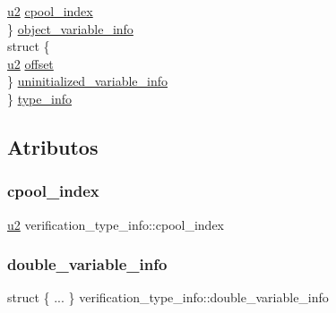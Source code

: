 \begin{DoxyCompactItemize}
\begin{tabbing}
\>\>\hyperlink{lista__operandos_8h_a732cde1300aafb73b0ea6c2558a7a54f}{u2} \hyperlink{structverification__type__info_a5be06fb276eacd06d97febe64d7be884}{cpool\_index}\\
\>\} \hyperlink{structverification__type__info_a8cc9c3b34278efa436261995cd97a326}{object\_variable\_info}\\
\>struct \{\\
\>\>\hyperlink{lista__operandos_8h_a732cde1300aafb73b0ea6c2558a7a54f}{u2} \hyperlink{structverification__type__info_a697499159761ac261e39a9f7aabfb27d}{offset}\\
\>\} \hyperlink{structverification__type__info_a732c79b23b52ddb0f77b5e25360d5253}{uninitialized\_variable\_info}\\
\} \hyperlink{structverification__type__info_a694db81e19f00bd3af2cfa2fca4c81d2}{type\_info}\\

\end{tabbing}\end{DoxyCompactItemize}


\subsection{Atributos}
\mbox{\label{structverification__type__info_a5be06fb276eacd06d97febe64d7be884}} 
\subsubsection{\texorpdfstring{cpool\+\_\+index}{cpool\_index}}
{\footnotesize\ttfamily \hyperlink{lista__operandos_8h_a732cde1300aafb73b0ea6c2558a7a54f}{u2} verification\+\_\+type\+\_\+info\+::cpool\+\_\+index}

\mbox{\label{structverification__type__info_a0198e2c34f8ffc66cbfe8adf0ab20170}} 
\subsubsection{\texorpdfstring{double\+\_\+variable\+\_\+info}{double\_variable\_info}}
{\footnotesize\ttfamily struct \{ ... \}   verification\+\_\+type\+\_\+info\+::double\+\_\+variable\+\_\+info}

